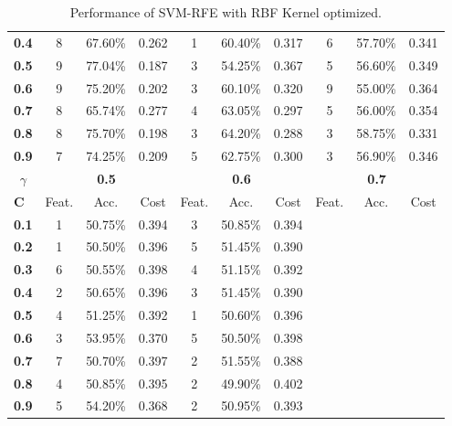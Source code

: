 \begin{table}[h]
\begin{tabular}{l | c c c|c c c|c c c}
        \textbf{0.4} &     8 & 67.60\% & 0.262 &     1 & 60.40\% & 0.317 &     6 & 57.70\% & 0.341\\
        \textbf{0.5} &     9 & 77.04\% & 0.187 &     3 & 54.25\% & 0.367 &     5 & 56.60\% & 0.349\\
        \textbf{0.6} &     9 & 75.20\% & 0.202 &     3 & 60.10\% & 0.320 &     9 & 55.00\% & 0.364\\
        \textbf{0.7} &     8 & 65.74\% & 0.277 &     4 & 63.05\% & 0.297 &     5 & 56.00\% & 0.354\\
        \textbf{0.8} &     8 & 75.70\% & 0.198 &     3 & 64.20\% & 0.288 &     3 & 58.75\% & 0.331\\
        \textbf{0.9} &     7 & 74.25\% & 0.209 &     5 & 62.75\% & 0.300 &     3 & 56.90\% & 0.346\\
        \bottomrule
        \toprule
        \multicolumn{1}{c}{$\gamma$} & \multicolumn{3}{c}{\textbf{0.5}} & \multicolumn{3}{c}{\textbf{0.6}} & \multicolumn{3}{c}{\textbf{0.7}}\\
        \midrule
        \textbf{C}&Feat.&Acc.&Cost&Feat.&Acc.&Cost&Feat.&Acc.&Cost \\
        \midrule
        \textbf{0.1} &     1 & 50.75\% & 0.394 &     3 & 50.85\% & 0.394 & & & \\
        \textbf{0.2} &     1 & 50.50\% & 0.396 &     5 & 51.45\% & 0.390 & & & \\
        \textbf{0.3} &     6 & 50.55\% & 0.398 &     4 & 51.15\% & 0.392 & & & \\
        \textbf{0.4} &     2 & 50.65\% & 0.396 &     3 & 51.45\% & 0.390 & & & \\
        \textbf{0.5} &     4 & 51.25\% & 0.392 &     1 & 50.60\% & 0.396 & & & \\
        \textbf{0.6} &     3 & 53.95\% & 0.370 &     5 & 50.50\% & 0.398 & & & \\
        \textbf{0.7} &     7 & 50.70\% & 0.397 &     2 & 51.55\% & 0.388 & & & \\
        \textbf{0.8} &     4 & 50.85\% & 0.395 &     2 & 49.90\% & 0.402 & & & \\
        \textbf{0.9} &     5 & 54.20\% & 0.368 &     2 & 50.95\% & 0.393 & & & \\
        \bottomrule
        \end{tabular}
    \caption{Performance of SVM-RFE with RBF Kernel optimized.}
\end{table}

